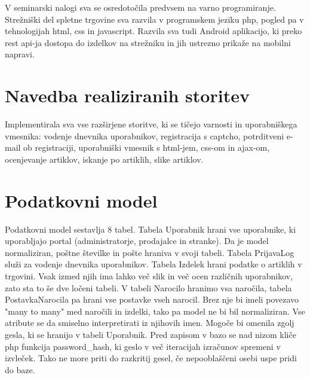 \documentclass[a4paper,12pt]{report}
\begin{document}
V seminarski nalogi sva se osredotočila predvsem na varno programiranje. Strežniški del spletne trgovine sva razvila v programskem jeziku php, pogled pa v tehnologijah html, css in javascript. Razvila sva tudi Android aplikacijo, ki preko rest api-ja dostopa do izdelkov na strežniku in jih ustrezno prikaže na mobilni napravi.


\chapter{Navedba realiziranih storitev}

Implementirala sva vse razširjene storitve, ki se tičejo varnosti in uporabniškega vmesnika: vodenje dnevnika uporabnikov, registracija s captcho, potrditveni e-mail ob registraciji, uporabniški vmesnik s html-jem, css-om in ajax-om, ocenjevanje artiklov, iskanje po artiklih, slike artiklov.


\chapter{Podatkovni model}

Podatkovni model sestavlja 8 tabel. Tabela Uporabnik hrani vse uporabnike, ki uporabljajo portal (administratorje, prodajalce in stranke). Da je model normaliziran, poštne številke in pošte hraniva v svoji tabeli. Tabela PrijavaLog služi za vodenje dnevnika uporabnikov. Tabela Izdelek hrani podatke o artiklih v trgovini. Vsak izmed njih ima lahko več slik in več ocen različnih uporabnikov, zato sta to še dve ločeni tabeli. V tabeli Narocilo hranimo vsa naročila, tabela PostavkaNarocila pa hrani vse postavke vseh narocil. Brez nje bi imeli povezavo "many to many" med naročili in izdelki, tako pa model ne bi bil normaliziran.\newline
Vse atribute se da smiselno interpretirati iz njihovih imen. Mogoče bi omenila zgolj gesla, ki se hranijo v tabeli Uporabnik. Pred zapisom v bazo se nad nizom kliče php funkcija password\_hash, ki geslo v več iteracijah izračunov spremeni v izvleček. Tako ne more priti do razkritij gesel, če nepooblaščeni osebi uspe pridi do baze.
\end{document}
